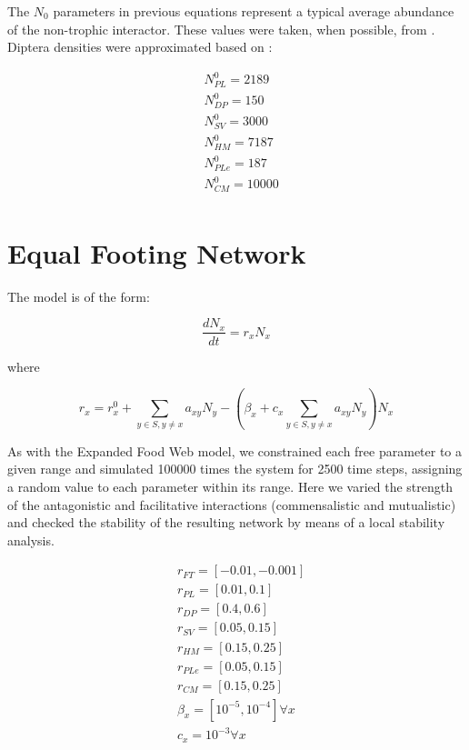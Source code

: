 The $N_0$ parameters in previous equations represent a typical average abundance of the non-trophic interactor. These values were taken, when possible, from \cite{Perez-Mellado2000,Perez-Mellado2006}. Diptera densities were approximated based on \cite{Braack1986}:

\begin{align*}
& N_{PL}^0 = 2189 \\
& N_{DP}^0 = 150 \\
& N_{SV}^0 = 3000 \\
& N_{HM}^0 = 7187 \\
& N_{PLe}^0 = 187 \\
& N_{CM}^0 = 10000 \\
\end{align*}

\section*{Equal Footing Network}

The model is of the form:

\begin{equation}
\frac{\mathit{dN}_x}{\mathit{dt}}=r_xN_x
\end{equation}

where

\begin{equation}
r_x=r_x^0+\sum _{y{\in}S,y{\neq}x}a_{\mathit{xy}}N_y-\left(\beta _x+c_x\sum _{y{\in}S,y{\neq}x}a_{\mathit{xy}}N_y\right)N_x
\end{equation}

As with the Expanded Food Web model, we constrained each free parameter to a given range and simulated 100000 times the system for 2500 time steps, assigning a random value to each parameter within its range. Here we varied the strength of the antagonistic and facilitative interactions (commensalistic and mutualistic) and checked the stability of the resulting network by means of a local stability analysis.

\begin{align*}
& r_{FT} = [-0.01,-0.001] \\
& r_{PL} = [0.01,0.1] \\
& r_{DP} = [0.4,0.6] \\
& r_{SV} = [0.05,0.15] \\
& r_{HM} = [0.15,0.25] \\
& r_{PLe} = [0.05,0.15] \\
& r_{CM} = [0.15,0.25] \\
& \beta_{x} = [10^{-5},10^{-4}] \forall x \\
& c_x = 10^{-3} \forall x
\end{align*}

